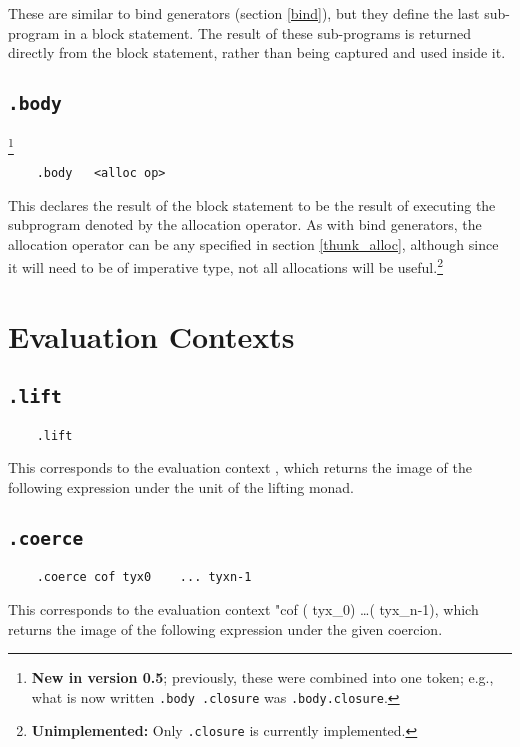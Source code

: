 \documentclass{report}
\newcommand\stringcode[1]{\texttt{#1}}
\newcommand\unimpl[1]{\footnote{\textbf{Unimplemented: }#1}}
\newcommand\new[2]{\footnote{\textbf{New in version #1}; previously, #2}}
\begin{document}
These are similar to bind generators (section \ref{bind}), but they define the last sub-program in a block statement.
The result of these sub-programs is returned directly from the block statement, rather than being captured and used inside it.

\subsection{\stringcode{.body}}
\new{0.5}{these were combined into one token; e.g., what is now written \stringcode{.body	.closure} was \stringcode{.body.closure}.}

\begin{verbatim}
	.body	<alloc op>
\end{verbatim}

This declares the result of the block statement to be the result of executing the subprogram denoted by the allocation operator.
As with bind generators, the allocation operator can be any specified in section \ref{thunk_alloc},
although since it will need to be of imperative type, not all allocations will be useful.\unimpl{Only \stringcode{.closure} is currently implemented.}

\section{Evaluation Contexts}
\label{cont_push}

\subsection{\stringcode{.lift}}

\begin{verbatim}
	.lift
\end{verbatim}

This corresponds to the evaluation context \<\lfloor\bullet\rfloor\>, which returns the image of the following expression under the unit of the lifting monad.

\subsection{\stringcode{.coerce}}

\begin{verbatim}
	.coerce	cof	tyx0	...	tyxn-1
\end{verbatim}
This corresponds to the evaluation context \<\bullet\;"\!\rhd\;cof ( tyx_0) \ldots ( tyx_{n-1})\>,
which returns the image of the following expression under the given coercion.
\end{document}
